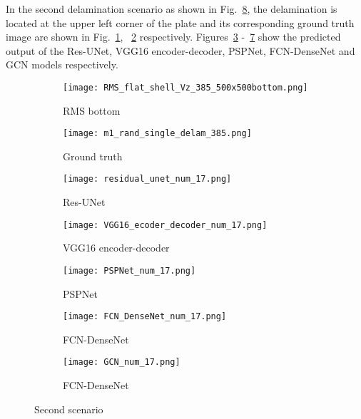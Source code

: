 In the second delamination scenario as shown in Fig.~\ref{fig:385_softmax}, the delamination is located at the upper left corner of the plate and its corresponding ground truth image are shown in Fig.~\ref{fig:RMS_flat_shell_Vz_385}, ~\ref{fig:m1_rand_single_delam_385} respectively. 
Figures~\ref{fig:Unet_Pred__softmax_385} -~\ref{fig:gcn_pred_385} show the predicted output of the Res-UNet, VGG16 encoder-decoder, PSPNet, FCN-DenseNet and GCN models respectively. 
\begin{figure}[!h]
	\centering
	\begin{subfigure}[b]{0.47\textwidth}
		\centering
		\texttt{[image: RMS\_flat\_shell\_Vz\_385\_500x500bottom.png]}
		\caption{RMS bottom}
		\label{fig:RMS_flat_shell_Vz_385}
	\end{subfigure}
	\hfill
	\begin{subfigure}[b]{0.47\textwidth}
		\centering
		\texttt{[image: m1\_rand\_single\_delam\_385.png]}
		\caption{Ground truth}
		\label{fig:m1_rand_single_delam_385}
	\end{subfigure}
	\begin{subfigure}[b]{0.47\textwidth}
		\centering
		\texttt{[image: residual\_unet\_num\_17.png]}
		\caption{Res-UNet}
		\label{fig:Unet_Pred__softmax_385}
	\end{subfigure}
	\hfill
	\begin{subfigure}[b]{0.47\textwidth}
		\centering
		\texttt{[image: VGG16\_ecoder\_decoder\_num\_17.png]}
		\caption{VGG16 encoder-decoder}			\label{fig:vgg16_pred__softmax_385}			
	\end{subfigure}
	\hfill
	\begin{subfigure}[b]{0.47\textwidth}
		\centering
		\texttt{[image: PSPNet\_num\_17.png]}
		\caption{PSPNet}
		\label{fig:pspnet_pred__softmax_385}
	\end{subfigure}	
	\hfill
	\begin{subfigure}[b]{0.47\textwidth}
		\centering
		\texttt{[image: FCN\_DenseNet\_num\_17.png]}
		\caption{FCN-DenseNet}
		\label{fig:fcn_densenet_pred__softmax_385}
	\end{subfigure}	
	\hfill
	\begin{subfigure}[b]{0.47\textwidth}
		\centering
		\texttt{[image: GCN\_num\_17.png]}
		\caption{FCN-DenseNet}
		\label{fig:gcn_pred_385}
	\end{subfigure}
	\caption{Second scenario}
	\label{fig:385_softmax}
\end{figure}
